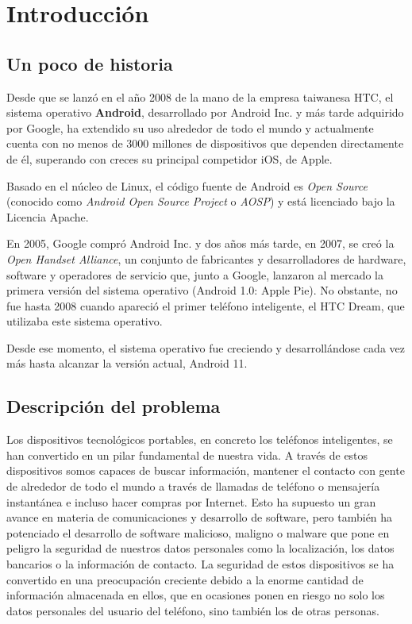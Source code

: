 \chapter{Introducción}

\section{Un poco de historia}

Desde que se lanzó en el año 2008 de la mano de la empresa taiwanesa HTC, el sistema operativo \textbf{Android}, desarrollado por Android Inc. y más tarde adquirido por Google,  ha extendido su uso alrededor de todo el mundo y actualmente cuenta con no menos de 3000 millones de dispositivos que dependen directamente de él, superando con creces su principal competidor iOS, de Apple.

Basado en el núcleo de Linux, el código fuente de Android es \textit{Open Source} (conocido como \textit{Android Open Source Project} o \textit{AOSP}) y está licenciado bajo la Licencia Apache.

En 2005, Google compró Android Inc. y dos años más tarde, en 2007, se creó la \textit{Open Handset Alliance}, un conjunto de fabricantes y desarrolladores de hardware, software y operadores de servicio que, junto a Google, lanzaron al mercado la primera versión del sistema operativo (Android 1.0: Apple Pie). No obstante, no fue hasta 2008 cuando apareció el primer teléfono inteligente, el HTC Dream, que utilizaba este sistema operativo.

Desde ese momento, el sistema operativo fue creciendo y desarrollándose cada vez más hasta alcanzar la versión actual, Android 11.

\section{Descripción del problema}

Los dispositivos tecnológicos portables, en concreto los teléfonos inteligentes, se han convertido en un pilar fundamental de nuestra vida. A través de estos dispositivos somos capaces de buscar información, mantener el contacto con gente de alrededor de todo el mundo a través de llamadas de teléfono o mensajería instantánea e incluso hacer compras por Internet. Esto ha supuesto un gran avance en materia de comunicaciones y desarrollo de software, pero también ha potenciado el desarrollo de software malicioso, maligno o malware que pone en peligro la seguridad de nuestros datos personales como la localización, los datos bancarios o la información de contacto. La seguridad de estos dispositivos se ha convertido en una preocupación creciente debido a la enorme cantidad de información almacenada en ellos, que en ocasiones ponen en riesgo no solo los datos personales del usuario del teléfono, sino también los de otras personas\hypersetup{citecolor=red}\cite{mobilesec}.

